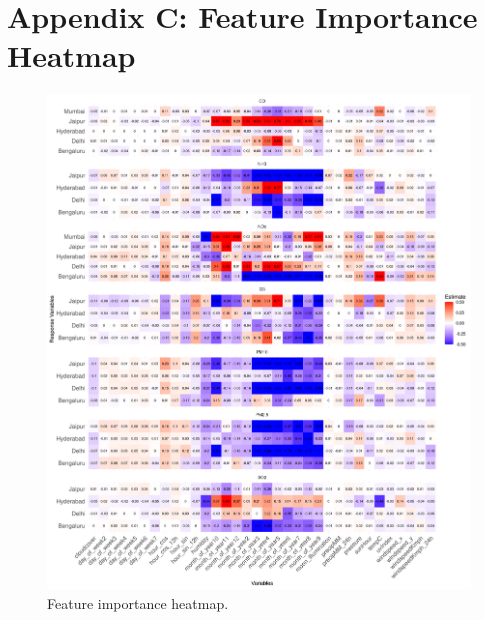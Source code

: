 \documentclass[twoside,11pt]{article}
\begin{document}
\section*{Appendix C: Feature Importance Heatmap}

\begin{figure}[H]
  \centering
  \includegraphics[width=\textwidth]{assets/feature-importance-heatmap.png}
  \caption{Feature importance heatmap.}
\end{figure}

\newpage










\end{document}
